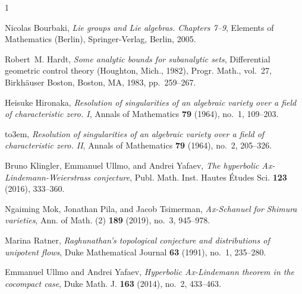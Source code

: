 \documentclass[12pt,reqno]{amsart}
\begin{document}
\renewcommand{\MR}[1]{}

\providecommand{\bysame}{\leavevmode\hbox to3em{\hrulefill}\thinspace}
\providecommand{\MR}{\relax\ifhmode\unskip\space\fi MR }
\providecommand{\MRhref}[2]{%
  \href{http://www.ams.org/mathscinet-getitem?mr=#1}{#2}
}
\providecommand{\href}[2]{#2}
\begin{thebibliography}{1}

Nicolas Bourbaki, \emph{{Lie groups and Lie algebras. Chapters 7--9}}, Elements of Mathematics (Berlin), Springer-Verlag, Berlin, 2005.

Robert~M. Hardt, \emph{Some analytic bounds for subanalytic sets}, Differential geometric control theory ({H}oughton, {M}ich., 1982), Progr. Math., vol.~27, Birkh\"auser Boston, Boston, MA, 1983, pp.~259--267. \MR{708507}

Heisuke Hironaka, \emph{Resolution of singularities of an algebraic variety over a field of characteristic zero. {I}}, Annals of Mathematics \textbf{79} (1964), no.~1, 109--203.

\bysame, \emph{Resolution of singularities of an algebraic variety over a field of characteristic zero. {II}}, Annals of Mathematics \textbf{79} (1964), no.~2, 205--326.

Bruno Klingler, Emmanuel Ullmo, and Andrei Yafaev, \emph{The hyperbolic {A}x-{L}indemann-{W}eierstrass conjecture}, Publ. Math. Inst. Hautes \'Etudes Sci. \textbf{123} (2016), 333--360. \MR{3502100}

Ngaiming Mok, Jonathan Pila, and Jacob Tsimerman, \emph{Ax-{S}chanuel for {S}himura varieties}, Ann. of Math. (2) \textbf{189} (2019), no.~3, 945--978. \MR{3961087}

Marina Ratner, \emph{Raghunathan's topological conjecture and distributions of unipotent flows}, Duke Mathematical Journal \textbf{63} (1991), no.~1, 235--280. \MR{1106945}

Emmanuel Ullmo and Andrei Yafaev, \emph{Hyperbolic {A}x-{L}indemann theorem in the cocompact case}, Duke Math. J. \textbf{163} (2014), no.~2, 433--463. \MR{3161318}

\end{thebibliography}
\end{document}
